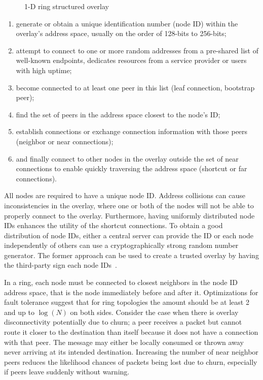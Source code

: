 \begin{figure}
\centering
{}
\caption{1-D ring structured overlay}
\label{fig:ring_overlay}
\end{figure}

\begin{enumerate}

\item generate or obtain a unique identification number (node ID) within the
overlay's address space, usually on the order of 128-bits to 256-bits;

\item attempt to connect to one or more random addresses from a pre-shared list
of well-known endpoints, dedicates resources from a service provider or users
with high uptime;

\item become connected to at least one peer in this list (leaf connection,
bootstrap peer);

\item find the set of peers in the address space closest to the node's ID;

\item establish connections or exchange connection information with those peers
(neighbor or near connections);

\item and finally connect to other nodes in the overlay outside the set of near
connections to enable quickly traversing the address space (shortcut or far
connections).

\end{enumerate}

All nodes are required to have a unique node ID.  Address collisions can cause
inconsistencies in the overlay, where one or both of the nodes will not be
able to properly connect to the overlay.  Furthermore, having uniformly
distributed node IDs enhances the utility of the shortcut connections.  To
obtain a good distribution of node IDs, either a central server can provide
the ID or each node independently of others can use a cryptographically strong
random number generator.  The former approach can be used to create a trusted
overlay by having the third-party sign each node IDs~\cite{secure_routing}.

In a ring, each node must be connected to closest neighbors in the node ID
address space, that is the node immediately before and after it.
Optimizations for fault tolerance suggest that for ring topologies the amount
should be at least 2 and up to $\log(N)$ on both sides.  Consider the case
when there is overlay disconnectivity potentially due to churn; a peer
receives a packet but cannot route it closer to the destination than itself
because it does not have a connection with that peer.  The message may either
be locally consumed or thrown away never arriving at its intended destination.
Increasing the number of near neighbor peers reduces the likelihood chances of
packets being lost due to churn, especially if peers leave suddenly without
warning.

